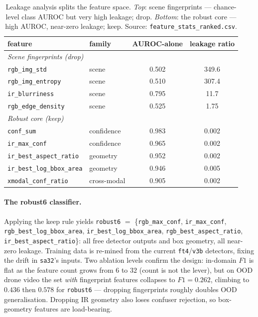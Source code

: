 \begin{table}[htbp]
    \centering
    \caption{Leakage analysis splits the feature space. \emph{Top}: scene fingerprints --- chance-level class AUROC but very high leakage; drop. \emph{Bottom}: the robust core --- high AUROC, near-zero leakage; keep. Source: \texttt{feature\_stats\_ranked.csv}.}
    \label{tab:leakage}
    \begin{tabular}{llcc}
        \toprule
        feature & family & AUROC-alone & leakage ratio \\
        \midrule
        \multicolumn{4}{l}{\emph{Scene fingerprints (drop)}} \\
        \texttt{rgb\_img\_std}       & scene       & 0.502 & 349.6 \\
        \texttt{rgb\_img\_entropy}   & scene       & 0.510 & 307.4 \\
        \texttt{ir\_blurriness}      & scene       & 0.795 & 11.7 \\
        \texttt{rgb\_edge\_density}  & scene       & 0.525 & 1.75 \\
        \midrule
        \multicolumn{4}{l}{\emph{Robust core (keep)}} \\
        \texttt{conf\_sum}             & confidence  & 0.983 & 0.002 \\
        \texttt{ir\_max\_conf}         & confidence  & 0.965 & 0.002 \\
        \texttt{ir\_best\_aspect\_ratio} & geometry  & 0.952 & 0.002 \\
        \texttt{ir\_best\_log\_bbox\_area} & geometry & 0.946 & 0.005 \\
        \texttt{xmodal\_conf\_ratio}   & cross-modal & 0.905 & 0.002 \\
        \bottomrule
    \end{tabular}
\end{table}

\paragraph{The robust6 classifier.}
Applying the keep rule yields \texttt{robust6} $=$ \{\texttt{rgb\_max\_conf}, \texttt{ir\_max\_conf}, \texttt{rgb\_best\_log\_bbox\_area}, \texttt{ir\_best\_log\_bbox\_area}, \texttt{rgb\_best\_aspect\_ratio}, \texttt{ir\_best\_aspect\_ratio}\}: all free detector outputs and box geometry, all near-zero leakage. Training data is re-mined from the current \texttt{ft4}/\texttt{v3b} detectors, fixing the drift in \texttt{sa32}'s inputs. Two ablation levels confirm the design: in-domain $F1$ is flat as the feature count grows from $6$ to $32$ (count is not the lever), but on OOD drone video the set \emph{with} fingerprint features collapses to $F1=0.262$, climbing to $0.436$ then $0.578$ for \texttt{robust6} --- dropping fingerprints roughly doubles OOD generalisation. Dropping IR geometry also loses confuser rejection, so box-geometry features are load-bearing.

